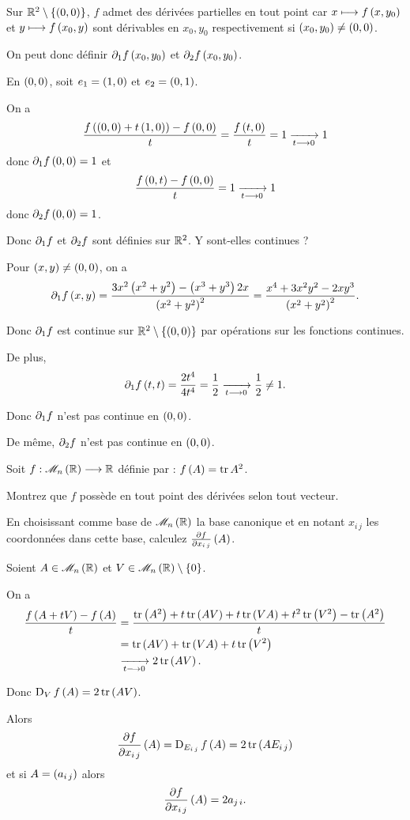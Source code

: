 \begin{corr}
Sur \(\mathbb{R}^2\setminus\left\lbrace\left(0,0\right)\right\rbrace\), \(f\) admet des dérivées partielles en tout point car \(x\longmapsto f\left(x,y_0\right)\) et \(y\longmapsto f\left(x_0,y\right)\) sont dérivables en \(x_0,y_0\) respectivement si \(\left(x_0,y_0\right)\not=\left(0,0\right)\).

On peut donc définir \(\pdif{1}f\paren{x_0,y_0}\) et \(\pdif{2}f\paren{x_0,y_0}\).

En \(\left(0,0\right)\), soit \(e_1=\left(1,0\right)\) et \(e_2=\left(0,1\right)\).

On a \[\dfrac{f\left(\left(0,0\right)+t\left(1,0\right)\right)-f\left(0,0\right)}{t}=\dfrac{f\left(t,0\right)}{t}=1\xrightarrow[t\longrightarrow0]{}1\] donc \(\pdif{1}f\paren{0,0}=1\) et \[\dfrac{f\left(0,t\right)-f\left(0,0\right)}{t}=1\xrightarrow[t\longrightarrow0]{}1\] donc \(\pdif{2}f\paren{0,0}=1\).

Donc \(\pdif{1}f\) et \(\pdif{2}f\) sont définies sur \(\mathbb{R}^2\). Y sont-elles continues ?

Pour \(\left(x,y\right)\not=\left(0,0\right)\), on a \[\pdif{1}f\paren{x,y}=\dfrac{3x^2\paren{x^2+y^2}-\paren{x^3+y^3}2x}{\paren{x^2+y^2}^2}=\dfrac{x^4+3x^2y^2-2xy^3}{\paren{x^2+y^2}^2}.\]

Donc \(\pdif{1}f\) est continue sur \(\mathbb{R}^2\setminus\left\lbrace\left(0,0\right)\right\rbrace\) par opérations sur les fonctions continues.

De plus, \[\pdif{1}f\paren{t,t}=\dfrac{2t^4}{4t^4}=\dfrac{1}{2}\tendqd{t\to0}\dfrac{1}{2}\not=1.\]

Donc \(\pdif{1}f\) n'est pas continue en \(\left(0,0\right)\).

De même, \(\pdif{2}f\) n'est pas continue en \(\left(0,0\right)\).
\end{corr}

\begin{exo}
Soit \(f:\M{n}[\R]\to\R\) définie par : \(f\left(A\right)=\operatorname{tr} A^2\).

Montrez que \(f\) possède en tout point des dérivées selon tout vecteur.

En choisissant comme base de \(\M{n}[\R]\) la base canonique et en notant \(x_{i\,j}\) les coordonnées dans cette base, calculez \(\pdv{f}{x_{i\,j}}\left(A\right)\).
\end{exo}

\begin{corr}
Soient \(A\in\M{n}[\R]\) et \(V\in\M{n}[\R]\excluant\accol{0}\).

On a \[\begin{aligned}
\dfrac{f\left(A+tV\right)-f\left(A\right)}{t}&=\dfrac{\operatorname{tr}\left(A^2\right)+t\operatorname{tr}\left(AV\right)+t\operatorname{tr}\left(VA\right)+t^2\operatorname{tr}\left(V^2\right)-\operatorname{tr}\left(A^2\right)}{t} \\
&=\operatorname{tr}\left(AV\right)+\operatorname{tr}\left(VA\right)+t\operatorname{tr}\left(V^2\right) \\
&\xrightarrow[t\longrightarrow0]{}2\operatorname{tr}\left(AV\right).
\end{aligned}\]

Donc \(\operatorname{D}_{V}f\left(A\right)=2\operatorname{tr}\left(AV\right)\).

Alors \[\pdv{f}{x_{i\,j}}\left(A\right)=\operatorname{D}_{E_{i\,j}}f\left(A\right)=2\operatorname{tr}\left(AE_{i\,j}\right)\] et si \(A=\left(a_{i\,j}\right)\) alors \[\pdv{f}{x_{i\,j}}\left(A\right)=2a_{j\,i}.\]
\end{corr}

